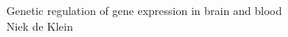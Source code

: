 \clearpage
{}

\restoregeometry
\clearpage

\noindent


\vspace{8cm}
\fontsize{40}{50}\selectfont  Genetic regulation of gene expression in brain and blood \\


\vspace{5cm}
\fontsize{25}{35}\selectfont 
\hfill Niek de Klein
\normalsize

\newpage




